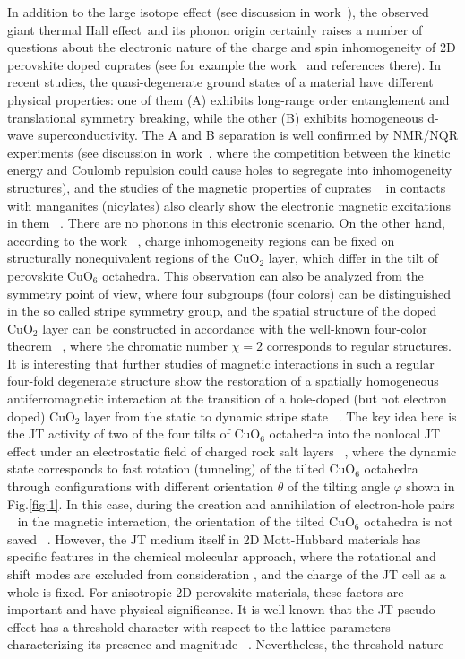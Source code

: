 \documentclass[%
 reprint,
groupedaddress,
 amsmath,amssymb,
 aps,
prb,
]{revtex4-1}
\begin{document}
In addition to the large isotope effect (see discussion in work~\cite{Bussmann2021}), the observed giant thermal Hall effect~\cite{Grissonnanche2019}and its phonon origin \cite{Grissonnanche2020} certainly raises a number of questions about the electronic nature of the charge and spin inhomogeneity of 2D perovskite doped cuprates (see for example the work ~\cite{Robinson2019}and references there). In recent studies, the quasi-degenerate ground states of a material have different physical properties: one of them (A) exhibits long-range order entanglement and translational symmetry breaking, while the other (B) exhibits homogeneous d-wave superconductivity. The A and B separation is well confirmed by NMR/NQR experiments (see discussion in work~\cite{Robinson2019}, where the competition between the kinetic energy and Coulomb repulsion could cause holes to segregate into inhomogeneity structures), and the studies of the magnetic properties of cuprates  ~\cite{Mahony2022} in contacts with manganites (nicylates) also clearly show the electronic magnetic excitations in them ~\cite{Deluca2014}. There are no phonons in this electronic scenario. On the other hand, according to the work ~\cite{Bianconi1996}, charge inhomogeneity regions can be fixed on structurally nonequivalent regions of the CuO$_2$ layer, which differ in the tilt of perovskite CuO$_6$ octahedra. This observation can also be analyzed from the symmetry point of view, where four subgroups (four colors) can be distinguished in the so called stripe symmetry group, and the spatial structure of the doped CuO$_2$ layer can be constructed in accordance with the well-known four-color theorem ~\cite{Gavrichkov2019}, where the chromatic number $\chi  = 2$   corresponds to regular structures.  It is interesting that further studies of magnetic interactions in such a regular four-fold degenerate structure show the restoration of a spatially homogeneous antiferromagnetic interaction at the transition of a hole-doped (but not electron doped) CuO$_2$ layer from the static to dynamic stripe state ~\cite{Gavrichkov2022}. The key idea here is the JT activity of two of the four tilts of CuO$_6$ octahedra into the nonlocal JT effect under an electrostatic field of charged rock salt layers ~\cite{Gavrichkov2019, Gavrichkov2022}, where the dynamic state corresponds to fast rotation (tunneling) of the tilted CuO$_6$ octahedra through configurations with different orientation $\theta$  of the tilting angle  $\varphi$  shown in Fig.\ref{fig:1}. In this case, during the creation and annihilation of electron-hole pairs ~\cite{Gavrichkov2017, Gavrichkov2020, Mikhaylovskiy2020} in the magnetic interaction, the orientation of the tilted CuO$_6$ octahedra is not saved ~\cite{Gavrichkov2022}. However, the JT medium itself in 2D Mott-Hubbard materials has specific features in the chemical molecular approach, where the rotational and shift modes are excluded from consideration \cite{Bersuker1989}, and the charge of the JT cell as a whole is fixed. For anisotropic 2D perovskite materials, these factors are important and have physical significance. It is well known that the JT pseudo effect has a threshold character with respect to the lattice parameters characterizing its presence and magnitude ~\cite{Bersuker1996}. Nevertheless, the threshold nature 
\end{document}

